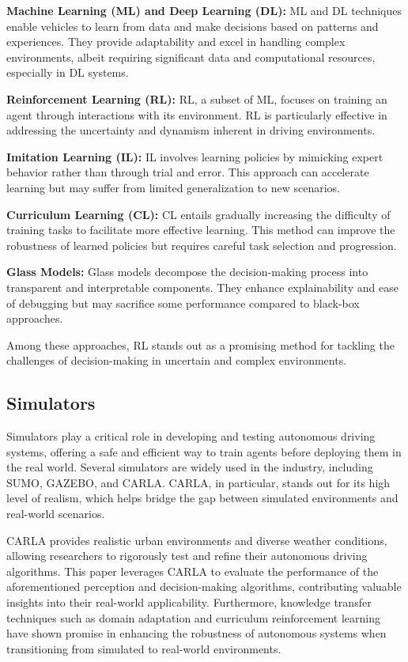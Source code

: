 \documentclass[conference]{IEEEtran}
\begin{document}
\textbf{Machine Learning (ML) and Deep Learning (DL):} ML and DL techniques enable vehicles to learn from data and make decisions based on patterns and experiences. They provide adaptability and excel in handling complex environments, albeit requiring significant data and computational resources, especially in DL systems.

\textbf{Reinforcement Learning (RL):} RL, a subset of ML, focuses on training an agent through interactions with its environment. RL is particularly effective in addressing the uncertainty and dynamism inherent in driving environments.

\textbf{Imitation Learning (IL):} IL involves learning policies by mimicking expert behavior rather than through trial and error. This approach can accelerate learning but may suffer from limited generalization to new scenarios.

\textbf{Curriculum Learning (CL):} CL entails gradually increasing the difficulty of training tasks to facilitate more effective learning. This method can improve the robustness of learned policies but requires careful task selection and progression.

\textbf{Glass Models:} Glass models decompose the decision-making process into transparent and interpretable components. They enhance explainability and ease of debugging but may sacrifice some performance compared to black-box approaches.

Among these approaches, RL stands out as a promising method for tackling the challenges of decision-making in uncertain and complex environments.

\subsection{Simulators}

Simulators play a critical role in developing and testing autonomous driving systems, offering a safe and efficient way to train agents before deploying them in the real world. Several simulators are widely used in the industry, including SUMO, GAZEBO, and CARLA. CARLA, in particular, stands out for its high level of realism, which helps bridge the gap between simulated environments and real-world scenarios.

CARLA provides realistic urban environments and diverse weather conditions, allowing researchers to rigorously test and refine their autonomous driving algorithms. This paper leverages CARLA to evaluate the performance of the aforementioned perception and decision-making algorithms, contributing valuable insights into their real-world applicability. 
Furthermore, knowledge transfer techniques such as domain adaptation and curriculum reinforcement learning have shown promise in enhancing the robustness of autonomous systems when transitioning from simulated to real-world environments.
\end{document}
